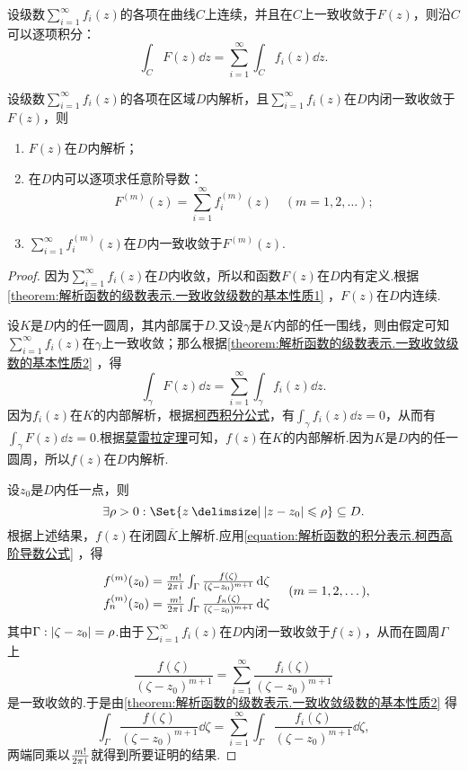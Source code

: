 \begin{theorem}\label{theorem:解析函数的级数表示.一致收敛级数的基本性质2}
设级数\(\sum\limits_{i=1}^{\infty} f_i(z)\)的各项在曲线\(C\)上连续，并且在\(C\)上一致收敛于\(F(z)\)，则沿\(C\)可以逐项积分：\[
\int_C F(z) \dd{z}
= \sum\limits_{i=1}^{\infty} \int_C f_i(z) \dd{z}.
\]
\end{theorem}

\begin{theorem}[魏尔斯特拉斯定理]\label{theorem:解析函数的级数表示.魏尔斯特拉斯定理}
设级数\(\sum\limits_{i=1}^{\infty} f_i(z)\)的各项在区域\(D\)内解析，且\(\sum\limits_{i=1}^{\infty} f_i(z)\)在\(D\)内闭一致收敛于\(F(z)\)，则\begin{enumerate}
\item \(F(z)\)在\(D\)内解析；
\item 在\(D\)内可以逐项求任意阶导数：\[
F^{(m)}(z) = \sum\limits_{i=1}^{\infty} f_i^{(m)}(z)
\quad(m=1,2,\dotsc);
\]
\item \(\sum\limits_{i=1}^{\infty} f_i^{(m)}(z)\)在\(D\)内一致收敛于\(F^{(m)}(z)\).
\end{enumerate}
\begin{proof}
因为\(\sum\limits_{i=1}^{\infty} f_i(z)\)在\(D\)内收敛，所以和函数\(F(z)\)在\(D\)内有定义.根据\cref{theorem:解析函数的级数表示.一致收敛级数的基本性质1} ，\(F(z)\)在\(D\)内连续.

设\(K\)是\(D\)内的任一圆周，其内部属于\(D\).又设\(\gamma\)是\(K\)内部的任一围线，则由假定可知\(\sum\limits_{i=1}^{\infty} f_i(z)\)在\(\gamma\)上一致收敛；那么根据\cref{theorem:解析函数的级数表示.一致收敛级数的基本性质2} ，得\[
\int_{\gamma} F(z) \dd{z} = \sum\limits_{i=1}^{\infty} \int_{\gamma} f_i(z) \dd{z}.
\]因为\(f_i(z)\)在\(K\)的内部解析，根据\hyperref[equation:解析函数的积分表示.柯西积分公式]{柯西积分公式}，有\(\int_{\gamma} f_i(z) \dd{z} = 0\)，从而有\(\int_{\gamma} F(z) \dd{z} = 0\).根据\hyperref[theorem:解析函数的积分表示.莫雷拉定理]{莫雷拉定理}可知，\(f(z)\)在\(K\)的内部解析.因为\(K\)是\(D\)内的任一圆周，所以\(f(z)\)在\(D\)内解析.

\def\f#1{f\ifx\relax#1\relax\else_{#1}\fi^{(m)}(z_0) = \frac{m!}{2\pi\iu} \int_{\Gamma} \frac{f\ifx\relax#1\relax\else_{#1}\fi(\zeta)}{(\zeta-z_0)^{m+1}} \dd{\zeta}}
设\(z_0\)是\(D\)内任一点，则\[
\exists \rho > 0 : \Set{ z \given \abs{z-z_0} \leqslant \rho } \subseteq D.
\]根据上述结果，\(f(z)\)在闭圆\(\overline{K}\)上解析.应用\cref{equation:解析函数的积分表示.柯西高阶导数公式} ，得\[
\def\arraystretch{1.5}
\begin{array}{l}
\f{} \\
\f{n}
\end{array}
\quad(m=1,2,\dotsc),
\]其中\(\Gamma: \abs{\zeta-z_0}=\rho\).由于\(\sum\limits_{i=1}^{\infty} f_i(z)\)在\(D\)内闭一致收敛于\(f(z)\)，从而在圆周\(\Gamma\)上\[
\frac{f(\zeta)}{(\zeta-z_0)^{m+1}}
= \sum\limits_{i=1}^{\infty} \frac{f_i(\zeta)}{(\zeta-z_0)^{m+1}}
\]是一致收敛的.于是由\cref{theorem:解析函数的级数表示.一致收敛级数的基本性质2} 得\[
\int_{\Gamma} \frac{f(\zeta)}{(\zeta-z_0)^{m+1}} \dd{\zeta}
= \sum\limits_{i=1}^{\infty} \int_{\Gamma} \frac{f_i(\zeta)}{(\zeta-z_0)^{m+1}} \dd{\zeta},
\]两端同乘以\(\frac{m!}{2\pi\kern1pt\mathrm{i}\kern1pt}\)就得到所要证明的结果.
\end{proof}
\end{theorem}


